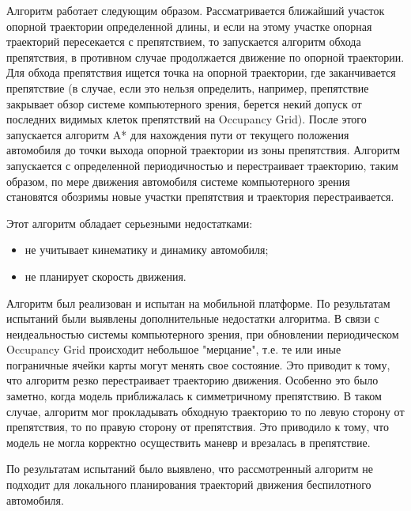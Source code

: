 Алгоритм работает следующим образом. Рассматривается ближайший участок опорной траектории определенной длины, и если
на этому участке опорная траекторий пересекается с препятствием, то запускается алгоритм обхода препятствия, в противном
случае продолжается движение по опорной траектории. Для обхода препятствия ищется точка на опорной траектории,
где заканчивается препятствие (в случае, если это нельзя определить, например, препятствие закрывает обзор системе
компьютерного зрения, берется некий допуск от последних видимых клеток препятствий на Occupancy Grid). После этого
запускается алгоритм A* для нахождения пути от текущего положения автомобиля до точки выхода опорной траектории из
зоны препятствия. Алгоритм запускается с определенной периодичностью и перестраивает траекторию, таким образом, по
мере движения автомобиля системе компьютерного зрения становятся обозримы новые участки препятствия и траектория
перестраивается.

Этот алгоритм обладает серьезными недостатками:
\begin{itemize}
      \item не учитывает кинематику и динамику автомобиля;
      \item не планирует скорость движения.
\end{itemize}

Алгоритм был реализован и испытан на мобильной платформе. По результатам испытаний были выявлены дополнительные
недостатки алгоритма. В связи с неидеальностью системы компьютерного зрения, при обновлении периодическом Occupancy Grid
происходит небольшое "мерцание", т.е. те или иные пограничные ячейки карты могут менять свое состояние. Это приводит
к тому, что алгоритм резко перестраивает траекторию движения. Особенно это было заметно, когда модель приближалась
к симметричному препятствию. В таком случае, алгоритм мог прокладывать обходную траекторию то по левую сторону от
препятствия, то по правую сторону от препятствия. Это приводило к тому, что модель не могла корректно осуществить
маневр и врезалась в препятствие.

По результатам испытаний было выявлено, что рассмотренный алгоритм не подходит для локального планирования траекторий
движения беспилотного автомобиля.

